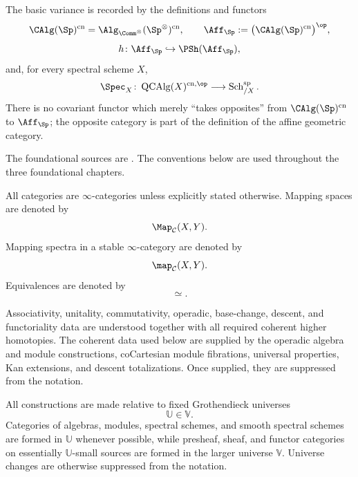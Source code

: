 The basic variance is recorded by the definitions and functors
\[
    \CAlg(\Sp)^{\mathrm{cn}}
    =
    \Alg_{\Comm^\otimes}(\Sp^\otimes)^{\mathrm{cn}},
    \qquad
    \Aff_{\Sp}
    :=
    \bigl(\CAlg(\Sp)^{\mathrm{cn}}\bigr)^{\op},
\]
\[
    h
    \colon
    \Aff_{\Sp}
    \hookrightarrow
    \PSh(\Aff_{\Sp}),
\]
and, for every spectral scheme $X$,
\[
    \Spec_X
    \colon
    \operatorname{QCAlg}(X)^{\mathrm{cn},\op}
    \longrightarrow
    \operatorname{Sch}^{\mathrm{sp}}_{/X}.
\]
There is no covariant functor which merely ``takes opposites'' from
$\CAlg(\Sp)^{\mathrm{cn}}$ to $\Aff_{\Sp}$; the opposite category is part
of the definition of the affine geometric category.

The foundational sources are
\cite{LurieHigherAlgebra,LurieSAG,LurieDAGIV}. The conventions below are
used throughout the three foundational chapters.

\begin{convention}
\label{conv:spectral-infinity-categorical}
All categories are $\infty$-categories unless explicitly stated otherwise.
Mapping spaces are denoted by
\[
    \Map_{\mathcal C}(X,Y).
\]
Mapping spectra in a stable $\infty$-category are denoted by
\[
    \map_{\mathcal C}(X,Y).
\]
Equivalences are denoted by
\[
    \simeq.
\]
\end{convention}

\begin{convention}
\label{conv:spectral-higher-coherence}
Associativity, unitality, commutativity, operadic, base-change, descent,
and functoriality data are understood together with all required coherent
higher homotopies. The coherent data used below are supplied by the
operadic algebra and module constructions, coCartesian module fibrations,
universal properties, Kan extensions, and descent totalizations. Once
supplied, they are suppressed from the notation.
\end{convention}

\begin{convention}
\label{conv:size-spectral-ag}
All constructions are made relative to fixed Grothendieck universes
\[
    \mathbb U
    \in
    \mathbb V.
\]
Categories of algebras, modules, spectral schemes, and smooth spectral
schemes are formed in $\mathbb U$ whenever possible, while presheaf,
sheaf, and functor categories on essentially $\mathbb U$-small sources
are formed in the larger universe $\mathbb V$. Universe changes are
otherwise suppressed from the notation.

\end{convention}

